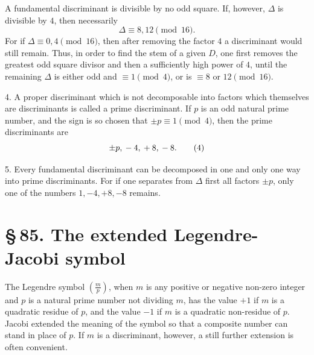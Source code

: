 \documentclass[11pt]{article}
\newcommand{\Jac}[2]{\left(\frac{#1}{#2}\right)}
\begin{document}
A fundamental discriminant is divisible by no odd square.  If, however, \(\Delta\) is divisible by \(4\), then necessarily
\begin{equation}
        \Delta\equiv8,12\pmod {16}.
\tag{3}
\end{equation}
For if \(\Delta\equiv0,4\pmod {16}\), then after removing the factor \(4\) a discriminant would still remain.  Thus, in order to find the stem of a given \(D\), one first removes the greatest odd square divisor and then a sufficiently high power of \(4\), until the remaining \(\Delta\) is either odd and \(\equiv1\pmod4\), or is \(\equiv8\) or \(12\pmod {16}\).

4. A proper discriminant which is not decomposable into factors which themselves are discriminants is called a prime discriminant.  If \(p\) is an odd natural prime number, and the sign is so chosen that \(\pm p\equiv1\pmod4\), then the prime discriminants are
\begin{equation}
        \pm p,\\ -4,\\ +8,\\ -8.
\tag{4}
\end{equation}

5. Every fundamental discriminant can be decomposed in one and only one way into prime discriminants.  For if one separates from \(\Delta\) first all factors \(\pm p\), only one of the numbers \(1,-4,+8,-8\) remains.

\section*{\S\,85. The extended Legendre-Jacobi symbol}

The Legendre symbol \(\Jac{m}{p}\), when \(m\) is any positive or negative non-zero integer and \(p\) is a natural prime number not dividing \(m\), has the value \(+1\) if \(m\) is a quadratic residue of \(p\), and the value \(-1\) if \(m\) is a quadratic non-residue of \(p\).  Jacobi extended the meaning of the symbol so that a composite number can stand in place of \(p\).  If \(m\) is a discriminant, however, a still further extension is often convenient.
\end{document}
